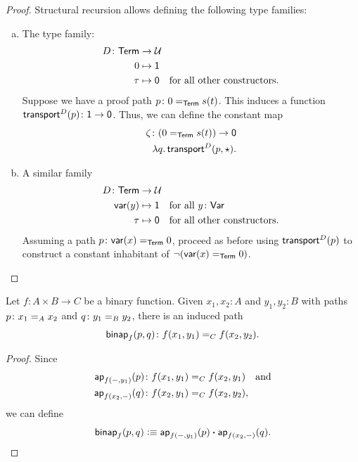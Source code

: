\begin{proof} 
    Structural recursion allows defining the following type families:
    \begin{enumerate}[a),font=\upshape]
        \item The type family:
        \begin{align*}
            D\colon\fun{Term}&\to\univ\\
            0&\mapsto\fun1\\
            \tau&\mapsto\fun0\quad
                \text{for all other constructors.}
        \end{align*}
        Suppose we have a proof path $p\colon 0\eq{\fun{Term}}s(t)$. This induces a function $\fun{transport}^D(p)\colon\fun{1}\to\fun{0}$. Thus, we can define the constant map
        \begin{align*}
            \zeta\colon(0\eq{\fun{Term}}s(t))\to\fun0\\
            \lambda q.\,\fun{transport}^D(p,\fstar).
        \end{align*}
        
        \item A similar family
        \begin{align*}
            D\colon\fun{Term}&\to\univ\\
            \fun{var}(y)&\mapsto\fun1
                \quad\text{for all }y\colon\fun{Var}\\
            \tau&\mapsto\fun0
                \quad\text{for all other constructors.}
        \end{align*}
        Assuming a path $p\colon\fun{var}(x)\eq{\fun{Term}}0$, proceed as before using $\mathsf{transport}^D(p)$ to construct a constant inhabitant of $\neg(\mathsf{var}(x)\mathrel{=_{\mathsf{Term}}}0)$. 
    \end{enumerate}
\end{proof}

\begin{lem}
    \label{lem:binap}
    Let\/ $f\colon A\times B\to C$ be a binary function. Given\/ $x_1,x_2\colon A$ and\/ $y_1,y_2\colon B$ with paths\/ $p\colon x_1\eq{A}x_2$ and\/ $q\colon y_1\eq{B}y_2$, there is an induced path
    \[
        \fun{binap}_f(p,q)\colon f(x_1,y_1)\eq{C}f(x_2,y_2).
    \]
\end{lem}

\begin{proof}
    Since
    \begin{align*}
        \fun{ap}_{f(\dummy,y_1)}(p)
            &\colon f(x_1,y_1)\eq Cf(x_2,y_1)
        \quad\text{and}\\
        \fun{ap}_{f(x_2,\dummy)}(q)
            &\colon f(x_2,y_1)\eq Cf(x_2,y_2),
    \end{align*}
    we can define
    \[
        \mathsf{binap}_f(p,q)\mathrel{\vcentcolon}\equiv
            \mathsf{ap}_{f({\mathord-},y_1)}(p)
            \mathbin{\boldsymbol{\cdot}}
            \mathsf{ap}_{f(x_2,{\mathord-})}(q).
    \]
\end{proof}

